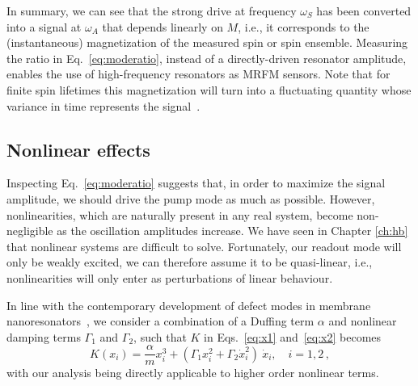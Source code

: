 In summary, we can see that the strong drive at frequency $\omega_S$ has been converted into a signal at $\omega_A$ that depends linearly on $M$, i.e., it corresponds to the (instantaneous) magnetization of the measured spin or spin ensemble. Measuring the ratio in Eq.~\eqref{eq:moderatio}, instead of a directly-driven resonator amplitude, enables the use of high-frequency resonators as MRFM sensors. Note that for finite spin lifetimes this magnetization will turn into a fluctuating quantity whose variance in time represents the signal~\cite{Grob_2019}.

\subsection{Nonlinear effects} \label{sec:nl}
Inspecting Eq.~\eqref{eq:moderatio} suggests that, in order to maximize the signal amplitude, we should drive the pump mode as much as possible. However, nonlinearities, which are naturally present in any real system, become non-negligible as the oscillation amplitudes increase. We have seen in Chapter \ref{ch:hb} that nonlinear systems are difficult to solve. Fortunately, our readout mode will only be weakly excited, we can therefore assume it to be {quasi-linear}, i.e., nonlinearities will only enter as perturbations of linear behaviour.  

In line with the contemporary development of defect modes in membrane nanoresonators~\cite{Catalini_2020}, we consider a combination of a Duffing term $\alpha$ and nonlinear damping terms $\Gamma_1$ and $\Gamma_2$, such that $K$ in Eqs.~\eqref{eq:x1} and~\eqref{eq:x2} becomes
\begin{equation}
K(x_i) = \frac{\alpha}{m} x_i^3 + (\Gamma_1 x_i^2 + \Gamma_2 \dot{x}_i^2)\: \dot{x}_i, \quad i = 1,2 \,,
\end{equation}
with our analysis being directly applicable to higher order nonlinear terms. 

